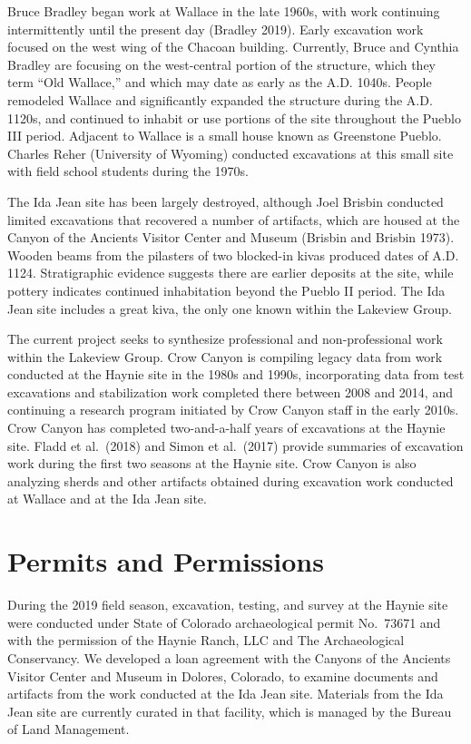 \documentclass[
  12pt,
]{krantz}
\begin{document}
Bruce Bradley began work at Wallace in the late 1960s, with work
continuing intermittently until the present day (Bradley 2019). Early
excavation work focused on the west wing of the Chacoan building.
Currently, Bruce and Cynthia Bradley are focusing on the west-central
portion of the structure, which they term ``Old Wallace,'' and which may
date as early as the A.D. 1040s. People remodeled Wallace and
significantly expanded the structure during the A.D. 1120s, and
continued to inhabit or use portions of the site throughout the Pueblo
III period. Adjacent to Wallace is a small house known as Greenstone
Pueblo. Charles Reher (University of Wyoming) conducted excavations at
this small site with field school students during the 1970s.

The Ida Jean site has been largely destroyed, although Joel Brisbin
conducted limited excavations that recovered a number of artifacts,
which are housed at the Canyon of the Ancients Visitor Center and Museum
(Brisbin and Brisbin 1973). Wooden beams from the pilasters of two
blocked-in kivas produced dates of A.D. 1124. Stratigraphic evidence
suggests there are earlier deposits at the site, while pottery indicates
continued inhabitation beyond the Pueblo II period. The Ida Jean site
includes a great kiva, the only one known within the Lakeview Group.

The current project seeks to synthesize professional and
non-professional work within the Lakeview Group. Crow Canyon is
compiling legacy data from work conducted at the Haynie site in the
1980s and 1990s, incorporating data from test excavations and
stabilization work completed there between 2008 and 2014, and continuing
a research program initiated by Crow Canyon staff in the early 2010s.
Crow Canyon has completed two-and-a-half years of excavations at the
Haynie site. Fladd et al.~(2018) and Simon et al.~(2017) provide
summaries of excavation work during the first two seasons at the Haynie
site. Crow Canyon is also analyzing sherds and other artifacts obtained
during excavation work conducted at Wallace and at the Ida Jean site.

\hypertarget{permits-and-permissions}{%
\section{Permits and Permissions}\label{permits-and-permissions}}

During the 2019 field season, excavation, testing, and survey at the
Haynie site were conducted under State of Colorado archaeological permit
No.~73671 and with the permission of the Haynie Ranch, LLC and The
Archaeological Conservancy. We developed a loan agreement with the
Canyons of the Ancients Visitor Center and Museum in Dolores, Colorado,
to examine documents and artifacts from the work conducted at the Ida
Jean site. Materials from the Ida Jean site are currently curated in
that facility, which is managed by the Bureau of Land Management.
\end{document}
